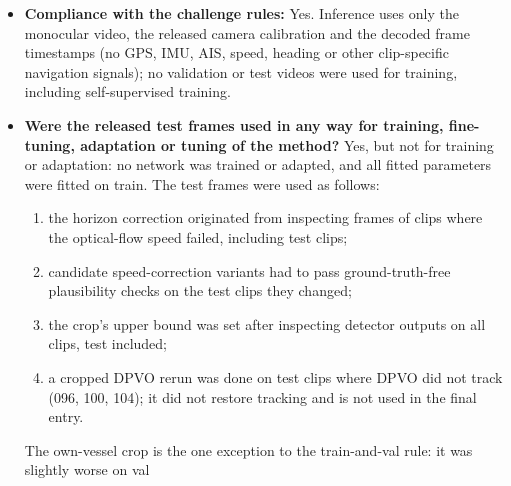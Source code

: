 \documentclass[11pt]{article}
\begin{document}
\begin{itemize}
    2 zoom, 1 flir-IR: 005 007 008 009 012 016 018 020 025 028 037 038 046 050 052 053 057 059 064 066 072 077 080 086)
    was used for model selection and gating: a variant was kept only if it was not worse than the current pipeline on
    both train and val, with one exception (the own-vessel crop, see below). Val choices include the speed-filter variant without the horizon-jump gate, the wide fusion
    (1/3 each rather than VGGT-$\Omega$ alone) and VGGT-$\Omega$ for flir-IR (decided mainly on val clip 046). There
    are no flir-VIS clips in val, so flir-VIS choices rest on the 8 train clips. Val clips 038 and 077 (and train clip
    021) were inspected while designing the flow method. Dev drift of the final configuration as submitted: train 10.56\,\%,
    val 10.62\,\% (mean). The released crop rule additionally crops dev clips 019, 040 (flir-IR), 032 (sionyx) and
    028 (zoom); these were not re-evaluated. On dev, the flow uses the DPVO seed with the most finite poses; on test, seed 0.
  \item \textbf{Compliance with the challenge rules:} Yes. Inference uses only the monocular video, the released
    camera calibration and the decoded frame timestamps (no GPS, IMU, AIS, speed, heading or other clip-specific
    navigation signals); no validation or test videos were used for training, including self-supervised training.
  \item \textbf{Were the released test frames used in any way for training, fine-tuning, adaptation or
    tuning of the method?} Yes, but not for training or adaptation: no network was trained or adapted, and all fitted
    parameters were fitted on train. The test frames were used as follows:
    \begin{enumerate}[label=(\roman*),nosep]
      \item the horizon correction originated from inspecting frames of clips where the optical-flow speed failed,
        including test clips;
      \item candidate speed-correction variants had to pass ground-truth-free plausibility checks on the test clips
        they changed;
      \item the crop's upper bound was set after inspecting detector outputs on all clips, test included;
      \item a cropped DPVO rerun was done on test clips where DPVO did not track (096, 100, 104); it did not restore
        tracking and is not used in the final entry.
    \end{enumerate}
    The own-vessel crop is the one exception to the train-and-val rule: it was slightly worse on val

\end{itemize}
\end{document}
